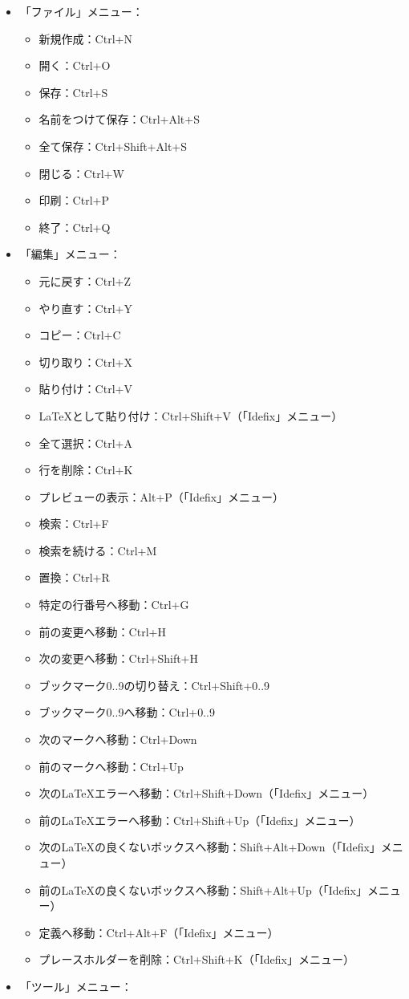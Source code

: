 \documentclass[]{book}
\begin{document}
\begin{itemize}
\item
  「ファイル」メニュー：

  \begin{itemize}
  \item
    新規作成：Ctrl+N
  \item
    開く：Ctrl+O
  \item
    保存：Ctrl+S
  \item
    名前をつけて保存：Ctrl+Alt+S
  \item
    全て保存：Ctrl+Shift+Alt+S
  \item
    閉じる：Ctrl+W
  \item
    印刷：Ctrl+P
  \item
    終了：Ctrl+Q
  \end{itemize}
\item
  「編集」メニュー：

  \begin{itemize}
  \item
    元に戻す：Ctrl+Z
  \item
    やり直す：Ctrl+Y
  \item
    コピー：Ctrl+C
  \item
    切り取り：Ctrl+X
  \item
    貼り付け：Ctrl+V
  \item
    LaTeXとして貼り付け：Ctrl+Shift+V（「Idefix」メニュー）
  \item
    全て選択：Ctrl+A
  \item
    行を削除：Ctrl+K
  \item
    プレビューの表示：Alt+P（「Idefix」メニュー）
  \item
    検索：Ctrl+F
  \item
    検索を続ける：Ctrl+M
  \item
    置換：Ctrl+R
  \item
    特定の行番号へ移動：Ctrl+G
  \item
    前の変更へ移動：Ctrl+H
  \item
    次の変更へ移動：Ctrl+Shift+H
  \item
    ブックマーク0..9の切り替え：Ctrl+Shift+0..9
  \item
    ブックマーク0..9へ移動：Ctrl+0..9
  \item
    次のマークへ移動：Ctrl+Down
  \item
    前のマークへ移動：Ctrl+Up
  \item
    次のLaTeXエラーへ移動：Ctrl+Shift+Down（「Idefix」メニュー）
  \item
    前のLaTeXエラーへ移動：Ctrl+Shift+Up（「Idefix」メニュー）
  \item
    次のLaTeXの良くないボックスへ移動：Shift+Alt+Down（「Idefix」メニュー）
  \item
    前のLaTeXの良くないボックスへ移動：Shift+Alt+Up（「Idefix」メニュー）
  \item
    定義へ移動：Ctrl+Alt+F（「Idefix」メニュー）
  \item
    プレースホルダーを削除：Ctrl+Shift+K（「Idefix」メニュー）
  \end{itemize}
\item
  「ツール」メニュー：


\end{itemize}
\end{document}
